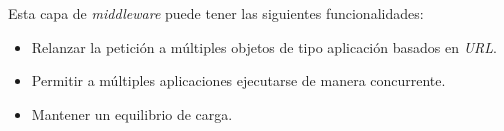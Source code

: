 Esta capa de \textit{middleware} puede tener las siguientes funcionalidades:
\begin{itemize}
	\item Relanzar la petición a múltiples objetos de tipo aplicación basados en \textit{URL}.
	\item Permitir a múltiples aplicaciones ejecutarse de manera concurrente.
	\item Mantener un equilibrio de carga.
\end{itemize}